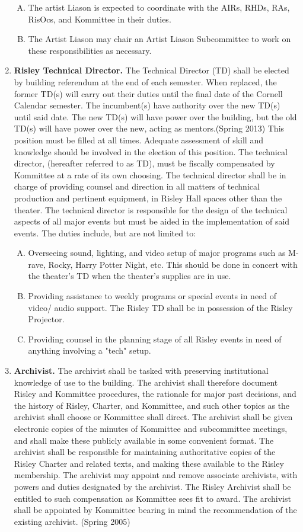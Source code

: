 \documentclass[12pt]{article}
\begin{document}
\begin{enumerate}[1.]
\begin{enumerate}[A.]
\item The artist Liason is expected to coordinate with the AIRs, RHDs, RAs, RisOcs, and Kommittee in their duties.
\item The Artist Liason may chair an Artist Liason Subcommittee to work on these responsibilities as necessary.
\end{enumerate}
\item \textbf{Risley Technical Director.} The Technical Director (TD) shall be elected by building referendum at the end of each semester. When replaced, the former TD(s) will carry out their duties until the final date of the Cornell Calendar semester. The incumbent(s) have authority over the new TD(s) until said date. The new TD(s) will have power over the building, but the old TD(s) will have power over the new, acting as mentors.(Spring 2013) This position must be filled at all times. Adequate assessment of skill and knowledge should be involved in the election of this position. The technical director, (hereafter referred to as TD), must be fiscally compensated by Kommittee at a rate of its own choosing. The technical director shall be in charge of providing counsel and direction in all matters of technical production and pertinent equipment, in Risley Hall spaces other than the theater. The technical director is responsible for the design of the technical aspects of all major events but must be aided in the implementation of said events. The duties include, but are not limited to: 
\begin{enumerate}[A.]
\item Overseeing sound, lighting, and video setup of major programs such as M-rave, Rocky, Harry Potter Night, etc. This should be done in concert with the theater's TD when the theater's supplies are in use. 
\item Providing assistance to weekly programs or special events in need of video/ audio support. The Risley TD shall be in possession of the Risley Projector. 
\item Providing counsel in the planning stage of all Risley events in need of anything involving a "tech" setup.
\end{enumerate}
\item \textbf{Archivist.} The archivist shall be tasked with preserving institutional knowledge of use to the building. The archivist shall therefore document Risley and Kommittee procedures, the rationale for major past decisions, and the history of Risley, Charter, and Kommittee, and such other topics as the archivist shall choose or Kommittee shall direct. The archivist shall be given electronic copies of the minutes of Kommittee and subcommittee meetings, and shall make these publicly available in some convenient format. The archivist shall be responsible for maintaining authoritative copies of the Risley Charter and related texts, and making these available to the Risley membership. The archivist may appoint and remove associate archivists, with powers and duties designated by the archivist. The Risley Archivist shall be entitled to such compensation as Kommittee sees fit to award. The archivist shall be appointed by Kommittee bearing in mind the recommendation of the existing archivist. (Spring 2005)

\end{enumerate}
\end{document}
